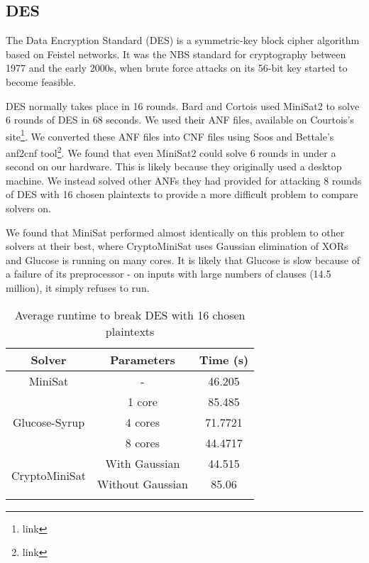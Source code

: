 \subsection{DES}
The Data Encryption Standard (DES) is a symmetric-key block cipher algorithm based on Feistel networks. It was the NBS standard for cryptography between 1977 and the early 2000s, when brute force attacks on its 56-bit key started to become feasible.\cite{find appropriate citation}


DES normally takes place in 16 rounds. Bard and Cortois\cite{citation} used MiniSat2 to solve 6 rounds of DES in 68 seconds. We used their ANF files, available on Courtois's site\footnote{link}. We converted these ANF files into CNF files using Soos and Bettale's anf2cnf tool\footnote{link}. We found that even MiniSat2 could solve 6 rounds in under a second on our hardware. This is likely because they originally used a desktop machine. We instead solved other ANFs they had provided for attacking 8 rounds of DES with 16 chosen plaintexts to provide a more difficult problem to compare solvers on.

We found that MiniSat performed almost identically on this problem to other solvers at their best, where CryptoMiniSat uses Gaussian elimination of XORs and Glucose is running on many cores. It is likely that Glucose is slow because of a failure of its preprocessor - on inputs with large numbers of clauses (14.5 million), it simply refuses to run. 

\begin{table}[!htbp]
	\centering
	\begin{tabular}{|c|c|c|}
		\hline
		\textbf{Solver} & \textbf{Parameters} & \textbf{Time (s)} \\
		\hline
		MiniSat & - & 46.205 \\
		\hline
		\multirow{3}{*}{Glucose-Syrup} & 1 core & 85.485 \\ \cline{2-3}
		& 4 cores & 71.7721 \\ \cline{2-3}
		& 8 cores & 44.4717 \\
		\hline
		
		\multirow{3}{*}{CryptoMiniSat} & With Gaussian & 44.515 \\ \cline{2-3} 
		& Without Gaussian & 85.06 \\ \cline{2-3} 
		\hline
	\end{tabular}
	
	\caption{Average runtime to break DES with 16 chosen plaintexts}
	\label{table:des:runtime}
\end{table}